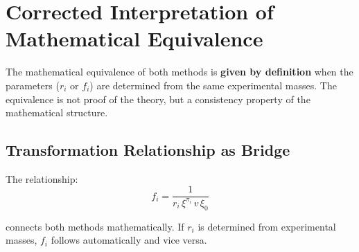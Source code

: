 	\section{Corrected Interpretation of Mathematical Equivalence}
	\label{sec:corrected_interpretation}
	
	\begin{keypoint}
		The mathematical equivalence of both methods is \textbf{given by definition} when the parameters ($r_i$ or $f_i$) are determined from the same experimental masses. The equivalence is not proof of the theory, but a consistency property of the mathematical structure.
	\end{keypoint}
	
	\subsection{Transformation Relationship as Bridge}
	\label{subsec:transformation_relationship}
	
	The relationship:
	\begin{equation}
		f_i = \frac{1}{r_i \, \xi^{\pi_i} \, v \, \xi_0}
		\label{eq:transformation_bridge}
	\end{equation}
	
	connects both methods mathematically. If $r_i$ is determined from experimental masses, $f_i$ follows automatically and vice versa.
	
	\begin{table}[H]
		\centering
		\caption{Numerical equivalence of both T0 methods for all leptons}
		\label{tab:numerical_equivalence_complete}
	\end{table}

